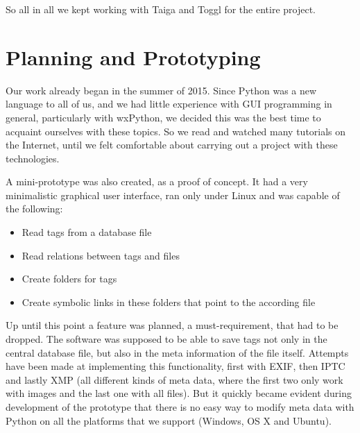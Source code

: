 So all in all we kept working with Taiga and Toggl for the entire project.


\section{Planning and Prototyping} %
\def\kapitelautor{Erik Ritschl}

Our work already began in the summer of 2015. Since Python was a new language
to all of us, and we had little experience with GUI programming in general,
particularly with wxPython, we decided this was the best time
to acquaint ourselves with these topics. So we read and watched many tutorials
on the Internet, until we felt comfortable about carrying out a project with
these technologies.

A mini-prototype was also created, as a proof of concept. It had a very
minimalistic graphical user interface, ran only under Linux and was capable of
the following:

\begin{itemize}
	\item Read tags from a database file
	\item Read relations between tags and files
	\item Create folders for tags
	\item Create symbolic links in these folders that point to the according file
\end{itemize}

Up until this point a feature was planned, a must-requirement, that had to be
dropped. The software was supposed to be able to save tags not only in the
central database file, but also in the meta information of the file itself.
Attempts have been made at implementing this functionality, first with EXIF,
then IPTC and lastly XMP (all different kinds of meta data, where the first two
only work with images and the last one with all files). But it quickly became
evident during development of the prototype that there is no easy way to modify
meta data with Python on all the platforms that we support (Windows, OS X and
Ubuntu).

